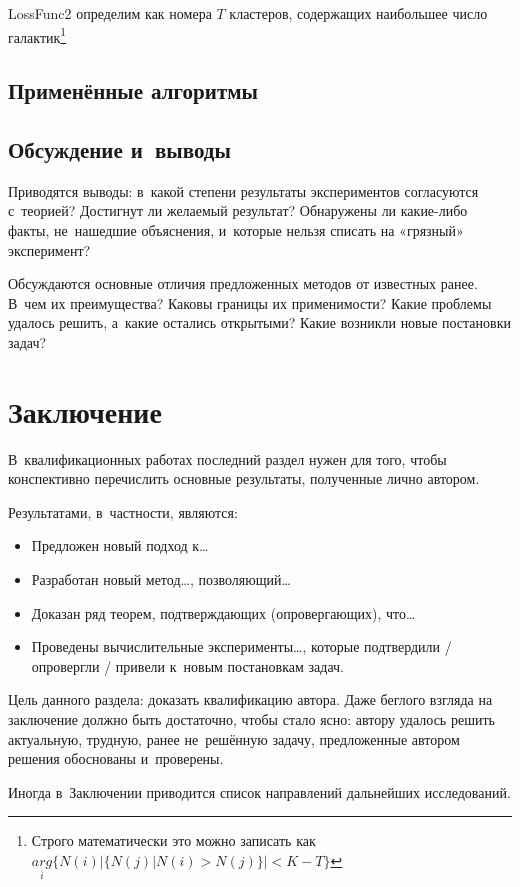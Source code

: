 \documentclass[12pt,fleqn]{article}
\begin{document}
LossFunc2 определим как номера $T$ кластеров, содержащих наибольшее число галактик\footnote{Строго математически это можно записать как $ \underset{i}{arg}\{N(i) |\{N(j) | N(i) > N(j)\}| < K-T\} $}

\subsection{Применённые алгоритмы}


\subsection{Обсуждение и~выводы}
Приводятся выводы:
в~какой степени результаты экспериментов согласуются с~теорией?
Достигнут ли желаемый результат?
Обнаружены ли какие-либо факты, не~нашедшие объяснения, и~которые нельзя списать на «грязный» эксперимент?

Обсуждаются основные отличия предложенных методов от известных ранее.
В~чем их преимущества?
Каковы границы их применимости?
Какие проблемы удалось решить, а~какие остались открытыми?
Какие возникли новые постановки задач?

\section{Заключение}

В~квалификационных работах последний раздел нужен для того, чтобы
конспективно перечислить основные результаты, полученные лично автором.

Результатами, в~частности, являются:
\begin{itemize}
\item
    Предложен новый подход к\dots
\item
    Разработан новый метод\dots, позволяющий\dots
\item
    Доказан ряд теорем, подтверждающих (опровергающих), что\dots
\item
    Проведены вычислительные эксперименты\dots,
    которые подтвердили / опровергли / привели к~новым постановкам задач.
\end{itemize}

Цель данного раздела: доказать квалификацию автора.
Даже беглого взгляда на заключение должно быть достаточно, чтобы стало ясно:
автору удалось решить актуальную, трудную, ранее не~решённую задачу,
предложенные автором решения обоснованы и~проверены.

Иногда в~Заключении приводится список направлений дальнейших исследований.
\end{document}
